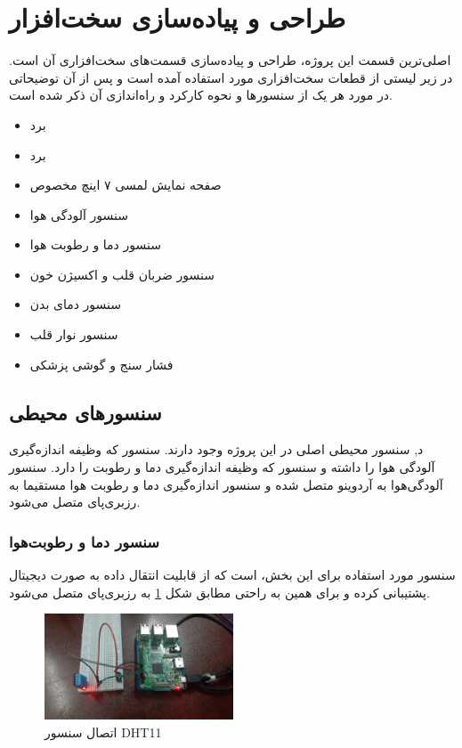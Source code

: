 \section{طراحی و پیاده‌سازی سخت‌افزار}

اصلی‌ترین قسمت این پروژه، طراحی و پیاده‌سازی قسمت‌های سخت‌افزاری آن است. در زیر لیستی از قطعات سخت‌افزاری مورد استفاده آمده است و پس‌ از آن توضیحاتی در مورد هر یک از سنسور‌ها و نحوه کارکرد و راه‌اندازی آن ذکر شده است.


\begin{itemize}
	\item برد 
	\item برد 
	\item صفحه نمایش لمسی ۷ اینچ مخصوص 
	\item سنسور آلودگی هوا 
	\item سنسور دما و رطوبت هوا 
	\item سنسور ضربان قلب و اکسیژن‌ خون 
	\item سنسور دمای بدن 
	\item سنسور نوار قلب 
	\item فشار سنج و گوشی پزشکی
\end{itemize}


\subsection{سنسورهای محیطی}

د, سنسور محیطی اصلی در این پروژه وجود دارند. سنسور  که وظیفه اندازه‌گیری آلودگی هوا را داشته و سنسور  که وظیفه اندازه‌گیری دما و رطوبت را دارد. سنسور آلودگی‌هوا به آردوینو متصل شده و سنسور اندازه‌گیری دما و رطوبت هوا مستقیما به رزبری‌پای متصل می‌شود.


\subsubsection{سنسور دما و رطوبت‌هوا}

سنسور مورد استفاده برای این بخش،  است که از قابلیت انتقال داده به صورت دیجیتال پشتیبانی کرده و برای همین به راحتی مطابق شکل \ref{fig:2} به رزبری‌پای متصل می‌شود.

\begin{figure}[h]
	\centering
	\includegraphics[width=0.5\textwidth]{figs/dht11.jpg}
	
	\caption{اتصال سنسور DHT11}
	\label{fig:2}
\end{figure}


